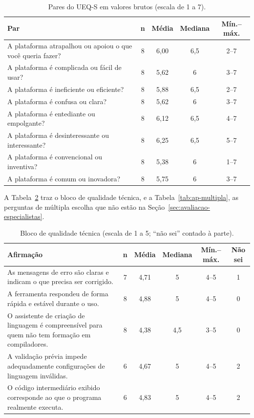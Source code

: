 \begin{table}[htbp]
\centering
\caption{Pares do UEQ-S em valores brutos (escala de 1 a 7).}
\label{tab:ap-ueqs}
\footnotesize
\renewcommand{\arraystretch}{1.2}
\begin{tabular}{|p{8.4cm}|c|c|c|c|}
\hline
\textbf{Par} & \textbf{n} & \textbf{Média} & \textbf{Mediana} & \textbf{Mín.--máx.} \\\hline
A plataforma atrapalhou ou apoiou o que você queria fazer? & 8 & 6,00 & 6,5 & 2--7 \\\hline
A plataforma é complicada ou fácil de usar? & 8 & 5,62 & 6 & 3--7 \\\hline
A plataforma é ineficiente ou eficiente? & 8 & 5,88 & 6,5 & 2--7 \\\hline
A plataforma é confusa ou clara? & 8 & 5,62 & 6 & 3--7 \\\hline
A plataforma é entediante ou empolgante? & 8 & 6,12 & 6,5 & 4--7 \\\hline
A plataforma é desinteressante ou interessante? & 8 & 6,25 & 6,5 & 5--7 \\\hline
A plataforma é convencional ou inventiva? & 8 & 5,38 & 6 & 1--7 \\\hline
A plataforma é comum ou inovadora? & 8 & 5,75 & 6 & 3--7 \\\hline
\end{tabular}
\end{table}

A Tabela~\ref{tab:ap-qualidade} traz o bloco de qualidade técnica, e a Tabela~\ref{tab:ap-multipla}, as perguntas de múltipla escolha que não estão na Seção~\ref{sec:avaliacao-especialistas}.

\begin{table}[htbp]
\centering
\caption{Bloco de qualidade técnica (escala de 1 a 5; ``não sei'' contado à parte).}
\label{tab:ap-qualidade}
\footnotesize
\renewcommand{\arraystretch}{1.2}
\begin{tabular}{|p{7.6cm}|c|c|c|c|c|}
\hline
\textbf{Afirmação} & \textbf{n} & \textbf{Média} & \textbf{Mediana} & \textbf{Mín.--máx.} & \textbf{Não sei} \\\hline
As mensagens de erro são claras e indicam o que precisa ser corrigido. & 7 & 4,71 & 5 & 4--5 & 1 \\\hline
A ferramenta respondeu de forma rápida e estável durante o uso. & 8 & 4,88 & 5 & 4--5 & 0 \\\hline
O assistente de criação de linguagem é compreensível para quem não tem formação em compiladores. & 8 & 4,38 & 4,5 & 3--5 & 0 \\\hline
A validação prévia impede adequadamente configurações de linguagem inválidas. & 6 & 4,67 & 5 & 4--5 & 2 \\\hline
O código intermediário exibido corresponde ao que o programa realmente executa. & 6 & 4,83 & 5 & 4--5 & 2 \\\hline
\end{tabular}
\end{table}

